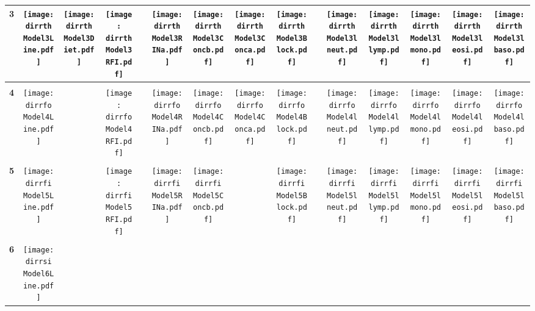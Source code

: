 \documentclass[landscape]{article}
\def \dirrth {/run/user/1000/gvfs/smb-share:server=cyfiles.iastate.edu,share=09/22/ntyet/R/RA/Data/RFI-newdata/resultsimulation/Model3.Line.Diet.RFI.Concb.Conca.RINa.lneut.llymp.lmono.leosi.lbaso.Block/}
\def \dirrfo {/run/user/1000/gvfs/smb-share:server=cyfiles.iastate.edu,share=09/22/ntyet/R/RA/Data/RFI-newdata/resultsimulation/Model4.Line.RFI.Concb.Conca.RINa.lneut.llymp.lmono.leosi.lbaso.Block/}
\def \dirrfi {/run/user/1000/gvfs/smb-share:server=cyfiles.iastate.edu,share=09/22/ntyet/R/RA/Data/RFI-newdata/resultsimulation/Model5.Line.RFI.Concb.RINa.lneut.llymp.lmono.leosi.lbaso.Block/}
\def \dirrsi{/run/user/1000/gvfs/smb-share:server=cyfiles.iastate.edu,share=09/22/ntyet/R/RA/Data/RFI-newdata/resultsimulation/Model6.Line.Concb.RINa.lneut.llymp.lmono.leosi.lbaso.Block/}
\begin{document}
\begin{table}
\begin{tabular}{ccccccccccccccc}
     \\[3.5pt]
      {\Huge \textbf{3}} 
      &\texttt{[image: \\dirrth Model3Line.pdf]}
      &\texttt{[image: \\dirrth Model3Diet.pdf]}
      &\texttt{[image: \\dirrth Model3RFI.pdf]}
      &
      &\texttt{[image: \\dirrth Model3RINa.pdf]}
      &\texttt{[image: \\dirrth Model3Concb.pdf]}
      &\texttt{[image: \\dirrth Model3Conca.pdf]}
      &\texttt{[image: \\dirrth Model3Block.pdf]}
      &
      &\texttt{[image: \\dirrth Model3lneut.pdf]}
      &\texttt{[image: \\dirrth Model3llymp.pdf]}
      &\texttt{[image: \\dirrth Model3lmono.pdf]}
      &\texttt{[image: \\dirrth Model3leosi.pdf]}
      &\texttt{[image: \\dirrth Model3lbaso.pdf]}
     \\[3.5pt]
     \hline
     \\[3.5pt]
     {\Huge \textbf{4}} 
      &\texttt{[image: \\dirrfo Model4Line.pdf]}
      &
      &\texttt{[image: \\dirrfo Model4RFI.pdf]}
      &
      &\texttt{[image: \\dirrfo Model4RINa.pdf]}
      &\texttt{[image: \\dirrfo Model4Concb.pdf]}
      &\texttt{[image: \\dirrfo Model4Conca.pdf]}
      &\texttt{[image: \\dirrfo Model4Block.pdf]}
      &
      &\texttt{[image: \\dirrfo Model4lneut.pdf]}
      &\texttt{[image: \\dirrfo Model4llymp.pdf]}
      &\texttt{[image: \\dirrfo Model4lmono.pdf]}
      &\texttt{[image: \\dirrfo Model4leosi.pdf]}
      &\texttt{[image: \\dirrfo Model4lbaso.pdf]}
     \\[3.5pt]
     \hline
     \\[3.5pt]
     {\Huge \textbf{5}} 
      &\texttt{[image: \\dirrfi Model5Line.pdf]}
      &
      &\texttt{[image: \\dirrfi Model5RFI.pdf]}
      &
      &\texttt{[image: \\dirrfi Model5RINa.pdf]}
      &\texttt{[image: \\dirrfi Model5Concb.pdf]}
      &
      &\texttt{[image: \\dirrfi Model5Block.pdf]}
      &
      &\texttt{[image: \\dirrfi Model5lneut.pdf]}
      &\texttt{[image: \\dirrfi Model5llymp.pdf]}
      &\texttt{[image: \\dirrfi Model5lmono.pdf]}
      &\texttt{[image: \\dirrfi Model5leosi.pdf]}
      &\texttt{[image: \\dirrfi Model5lbaso.pdf]}
     \\[3.5pt]
     \hline
     \\[3.5pt]
     {\Huge \textbf{6}} 
      &\texttt{[image: \\dirrsi Model6Line.pdf]}

\end{tabular}
\end{table}
\end{document}
